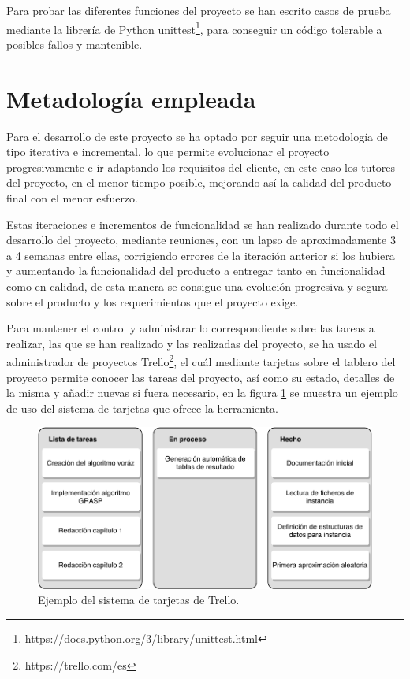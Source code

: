 Para probar las diferentes funciones del proyecto se han escrito casos de prueba mediante la librería de Python unittest\footnote{https://docs.python.org/3/library/unittest.html}, para conseguir un código tolerable a posibles fallos y mantenible.

\section{Metadología empleada}
Para el desarrollo de este proyecto se ha optado por seguir una metodología de tipo iterativa e incremental, lo que permite evolucionar el proyecto progresivamente e ir adaptando los requisitos del cliente, en este caso los tutores del proyecto, en el menor tiempo posible, mejorando así la calidad del producto final con el menor esfuerzo.

Estas iteraciones e incrementos de funcionalidad se han realizado durante todo el desarrollo del proyecto, mediante reuniones, con un lapso de aproximadamente 3 a 4 semanas entre ellas, corrigiendo errores de la iteración anterior si los hubiera y aumentando la funcionalidad del producto a entregar tanto en funcionalidad como en calidad, de esta manera se consigue una evolución progresiva y segura sobre el producto y los requerimientos que el proyecto exige.

Para mantener el control y administrar lo correspondiente sobre las tareas a realizar, las que se han realizado y las realizadas del proyecto, se ha usado el administrador de proyectos Trello\footnote{https://trello.com/es}, el cuál mediante tarjetas sobre el tablero del proyecto permite conocer las tareas del proyecto, así como su estado, detalles de la misma y añadir nuevas si fuera necesario, en la figura \ref{fig:trello-tarjetas} se muestra un ejemplo de uso del sistema de tarjetas que ofrece la herramienta.

\begin{figure}[H]
	\centering
	\includegraphics{Figures/trello-tarjetas.pdf}
	\caption{Ejemplo del sistema de tarjetas de Trello.}
	\label{fig:trello-tarjetas}
\end{figure}

